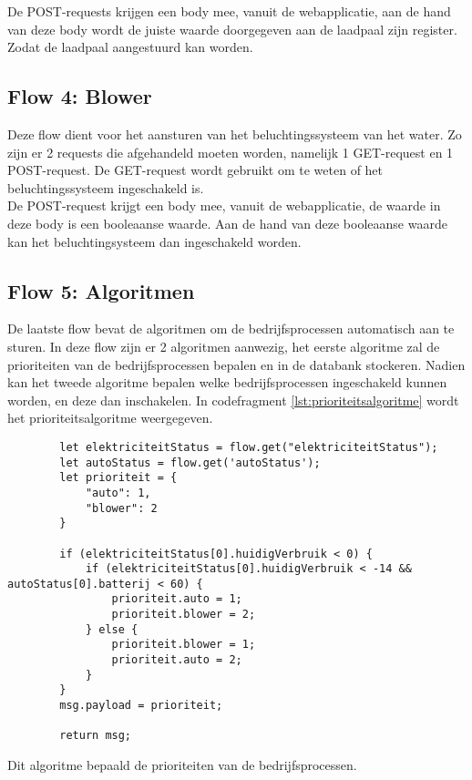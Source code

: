 De POST-requests krijgen een body mee, vanuit de webapplicatie, aan de hand van deze body wordt de juiste waarde doorgegeven aan de laadpaal zijn register. Zodat de laadpaal aangestuurd kan worden.

\subsection{Flow 4: Blower}
\label{subsec:proefopstelling-blower}

Deze flow dient voor het aansturen van het beluchtingssysteem van het water. Zo zijn er 2 requests die afgehandeld moeten worden, namelijk 1 GET-request en 1 POST-request. De GET-request wordt gebruikt om te weten of het beluchtingssysteem ingeschakeld is.\\

De POST-request krijgt een body mee, vanuit de webapplicatie, de waarde in deze body is een booleaanse waarde. Aan de hand van deze booleaanse waarde kan het beluchtingsysteem dan ingeschakeld worden.

\subsection{Flow 5: Algoritmen}
\label{subsec:proefopstelling-algoritmen}

De laatste flow bevat de algoritmen om de bedrijfsprocessen automatisch aan te sturen. In deze flow zijn er 2 algoritmen aanwezig, het eerste algoritme zal de prioriteiten van de bedrijfsprocessen bepalen en in de databank stockeren. Nadien kan het tweede algoritme bepalen welke bedrijfsprocessen ingeschakeld kunnen worden, en deze dan inschakelen. In codefragment \ref{lst:prioriteitsalgoritme} wordt het prioriteitsalgoritme weergegeven.

\begin{listing}[h!]
    \begin{verbatim}
        let elektriciteitStatus = flow.get("elektriciteitStatus");
        let autoStatus = flow.get('autoStatus');
        let prioriteit = {
            "auto": 1,
            "blower": 2
        }
    
        if (elektriciteitStatus[0].huidigVerbruik < 0) {
            if (elektriciteitStatus[0].huidigVerbruik < -14 && autoStatus[0].batterij < 60) {
                prioriteit.auto = 1;
                prioriteit.blower = 2;
            } else {
                prioriteit.blower = 1;
                prioriteit.auto = 2;
            }
        }
        msg.payload = prioriteit;
    
        return msg;
    \end{verbatim}
    \caption[prioriteitsalgoritme]{Dit algoritme bepaald de prioriteiten van de bedrijfsprocessen.}
    \label{lst:prioriteitsalgoritme}
\end{listing}


